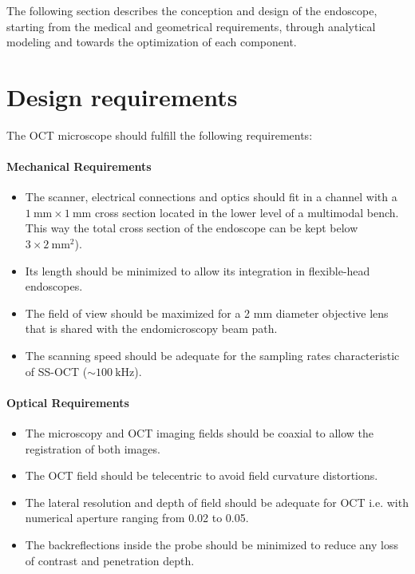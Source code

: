 The following section describes the conception and design of the endoscope, starting from the medical and geometrical requirements, through analytical modeling and towards the optimization of each component.

\section{Design requirements}

The OCT microscope should fulfill the following requirements:

\paragraph{Mechanical Requirements} 
\begin{itemize}

\item The scanner, electrical connections and optics should fit in a channel with a $\SI{1}{\milli\meter} \times \SI{1}{\milli\meter}$ cross section located in the lower level of a multimodal bench. This way the total cross section of the endoscope can be kept below $3 \times \SI{2}{\milli\meter^2}$). 
\item Its length should be minimized to allow its integration in flexible-head endoscopes.
\item The field of view should be maximized for a 2 mm diameter objective lens that is shared with the endomicroscopy beam path.
\item The scanning speed should be adequate for the sampling rates characteristic of SS-OCT ($\sim \SI{100}{\kilo\hertz} $).
\end{itemize}


\paragraph{Optical Requirements}

\begin{itemize}
\item The microscopy and OCT imaging fields should be coaxial to allow the registration of both images. 
\item The OCT field should be telecentric to avoid field curvature distortions.
\item The lateral resolution and depth of field should be adequate for OCT i.e. with numerical aperture ranging from 0.02 to 0.05.
\item The backreflections inside the probe should be minimized to reduce any loss of contrast and penetration depth.
\end{itemize}

